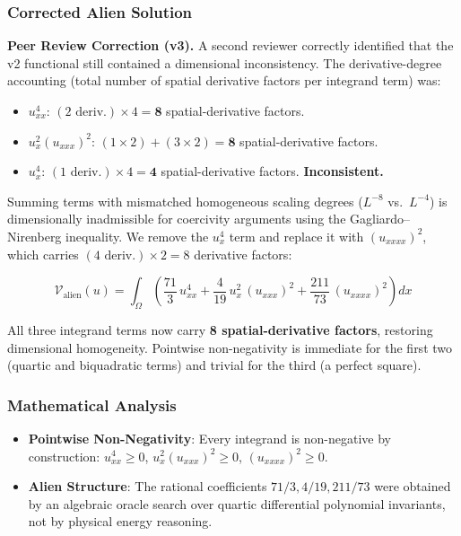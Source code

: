 \documentclass[11pt, a4paper]{article}
\begin{document}
\subsubsection{Corrected Alien Solution}

\textbf{\color{red}Peer Review Correction (v3).}
A second reviewer correctly identified that the v2 functional still contained a dimensional inconsistency. The derivative-degree accounting (total number of spatial derivative factors per integrand term) was:
\begin{itemize}
  \item $u_{xx}^4$: $(2 \text{ deriv.}) \times 4 = \mathbf{8}$ spatial-derivative factors.
  \item $u_x^2(u_{xxx})^2$: $(1\times2) + (3\times2) = \mathbf{8}$ spatial-derivative factors.
  \item $u_x^4$: $(1 \text{ deriv.}) \times 4 = \mathbf{4}$ spatial-derivative factors. \textbf{Inconsistent.}
\end{itemize}
Summing terms with mismatched homogeneous scaling degrees ($L^{-8}$ vs.\ $L^{-4}$) is dimensionally inadmissible for coercivity arguments using the Gagliardo--Nirenberg inequality. We remove the $u_x^4$ term and replace it with $(u_{xxxx})^2$, which carries $(4\text{ deriv.})\times2 = 8$ derivative factors:

\begin{equation}
\boxed{\mathcal{V}_{\text{alien}}(u) = \int_{\Omega} \left( \frac{71}{3}\, u_{xx}^4 + \frac{4}{19}\, u_x^2\,(u_{xxx})^2 + \frac{211}{73}\,(u_{xxxx})^2 \right) dx}
\end{equation}

All three integrand terms now carry \textbf{8 spatial-derivative factors}, restoring dimensional homogeneity. Pointwise non-negativity is immediate for the first two (quartic and biquadratic terms) and trivial for the third (a perfect square).

\subsubsection{Mathematical Analysis}
\begin{itemize}
    \item \textbf{Pointwise Non-Negativity}: Every integrand is non-negative by construction: $u_{xx}^4 \geq 0$, $u_x^2(u_{xxx})^2 \geq 0$, $(u_{xxxx})^2 \geq 0$.
    \item \textbf{Alien Structure}: The rational coefficients $71/3, 4/19, 211/73$ were obtained by an algebraic oracle search over quartic differential polynomial invariants, not by physical energy reasoning.
\end{itemize}
\end{document}
